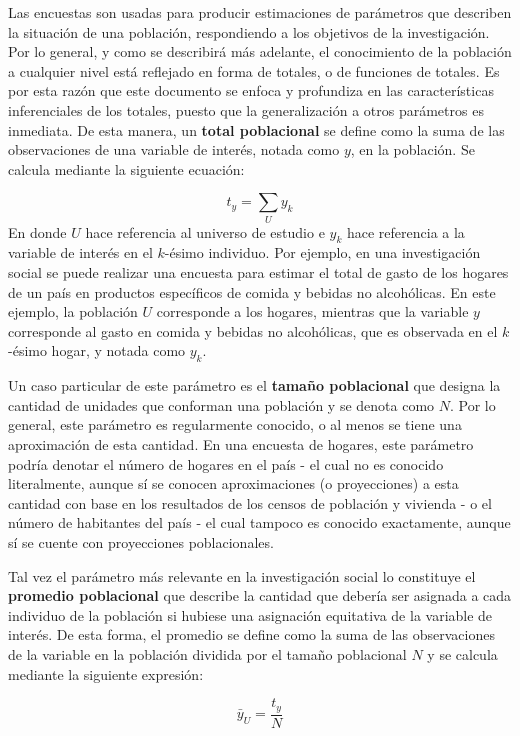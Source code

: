 \documentclass[12pt,spanish,]{book}
\begin{document}
Las encuestas son usadas para producir estimaciones de parámetros que describen la situación de una población, respondiendo a los objetivos de la investigación. Por lo general, y como se describirá más adelante, el conocimiento de la población a cualquier nivel está reflejado en forma de totales, o de funciones de totales. Es por esta razón que este documento se enfoca y profundiza en las características inferenciales de los totales, puesto que la generalización a otros parámetros es inmediata. De esta manera, un \textbf{total poblacional} se define como la suma de las observaciones de una variable de interés, notada como \(y\), en la población. Se calcula mediante la siguiente ecuación:

\[t_y = \sum_U y_k\]
En donde \(U\) hace referencia al universo de estudio e \(y_k\) hace referencia a la variable de interés en el \(k\)-ésimo individuo. Por ejemplo, en una investigación social se puede realizar una encuesta para estimar el total de gasto de los hogares de un país en productos específicos de comida y bebidas no alcohólicas. En este ejemplo, la población \(U\) corresponde a los hogares, mientras que la variable \(y\) corresponde al gasto en comida y bebidas no alcohólicas, que es observada en el \(k\)-ésimo hogar, y notada como \(y_k\).

Un caso particular de este parámetro es el \textbf{tamaño poblacional} que designa la cantidad de unidades que conforman una población y se denota como \(N\). Por lo general, este parámetro es regularmente conocido, o al menos se tiene una aproximación de esta cantidad. En una encuesta de hogares, este parámetro podría denotar el número de hogares en el país - el cual no es conocido literalmente, aunque sí se conocen aproximaciones (o proyecciones) a esta cantidad con base en los resultados de los censos de población y vivienda - o el número de habitantes del país - el cual tampoco es conocido exactamente, aunque sí se cuente con proyecciones poblacionales.

Tal vez el parámetro más relevante en la investigación social lo constituye el \textbf{promedio poblacional} que describe la cantidad que debería ser asignada a cada individuo de la población si hubiese una asignación equitativa de la variable de interés. De esta forma, el promedio se define como la suma de las observaciones de la variable en la población dividida por el tamaño poblacional \(N\) y se calcula mediante la siguiente expresión:

\[\bar{y}_U = \frac{t_y}{N}\]
\end{document}
